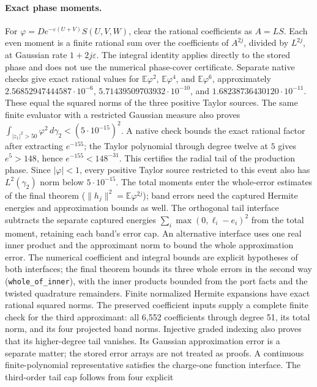 \documentclass[11pt,a4paper]{article}
\newcommand{\E}{\mathbb{E}}
\newcommand{\lean}[1]{\texttt{\small #1}}
\begin{document}
\paragraph{Exact phase moments.}
For $\varphi=D e^{-\varepsilon(U+V)}S(U,V,W)$, clear the rational coefficients
as $A=LS$. Each even moment is a finite rational sum over the coefficients of
$A^{2j}$, divided by $L^{2j}$, at Gaussian rate $1+2j\varepsilon$.
The integral identity applies directly to the stored phase and does not use
the numerical phase-cover certificate. Separate native checks give exact
rational values for $\E\varphi^2$, $\E\varphi^4$, and $\E\varphi^6$,
approximately $2.56852947444587\cdot10^{-6}$,
$5.71439509703932\cdot10^{-10}$, and $1.68238736430120\cdot10^{-11}$.
These equal the squared norms of the three positive Taylor sources.
The same finite evaluator with a restricted Gaussian measure also proves
$\int_{|z_1|^2>50}\varphi^2\,d\gamma_2<(5\cdot10^{-15})^2$.
A native check bounds the exact rational factor after extracting $e^{-155}$;
the Taylor polynomial through degree twelve at $5$ gives $e^5>148$, hence
$e^{-155}<148^{-31}$. This certifies the radial tail of the production phase.
Since $|\varphi|<1$, every positive Taylor source restricted to this event
also has $L^2(\gamma_2)$ norm below $5\cdot10^{-15}$.
The total moments enter the whole-error estimates of the final theorem
($\|h_j\|^2=\E\varphi^{2j}$); band errors need the captured Hermite energies and
approximation bounds as well.
The orthogonal tail interface subtracts the separate captured energies
$\sum_i\max(0,\ell_i-e_i)^2$ from the total moment, retaining each band's
error cap. An alternative interface uses one real inner product and the
approximant norm to bound the whole approximation error. The numerical
coefficient and integral bounds are explicit hypotheses of both interfaces;
the final theorem bounds its three whole errors in the second way
(\lean{whole\_of\_inner}), with the inner products bounded from the port facts
and the twisted quadrature remainders.
Finite normalized Hermite expansions have exact rational squared norms.
The preserved coefficient inputs supply a complete finite check for the third
approximant: all 6,552 coefficients through degree 51, its total norm, and its
four projected band norms. Injective graded indexing also proves that its
higher-degree tail vanishes. Its Gaussian approximation error is a separate
matter; the stored error arrays are not treated as proofs.
A continuous finite-polynomial representative satisfies the charge-one
function interface. The third-order tail cap follows from four explicit
\end{document}
